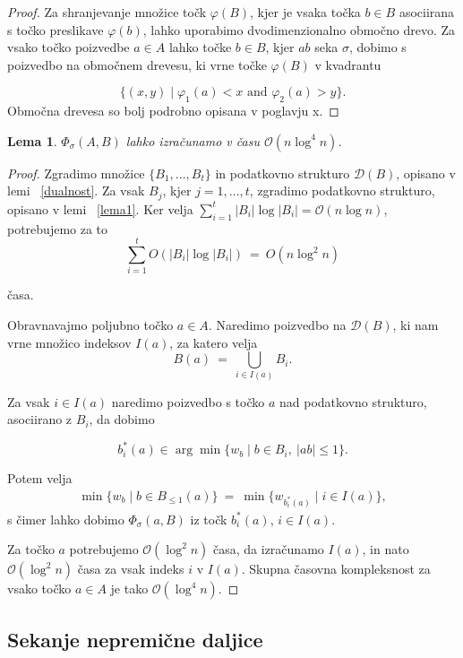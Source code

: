 \documentclass[a4paper, 12pt]{book}
\newcommand{\D}{\ensuremath{\mathcal{D}}}
\newcommand{\OO}{\ensuremath{\mathcal{O}}} %
\newtheorem{lema}[izrek]{Lema}
\begin{document}
\begin{proof}
Za shranjevanje množice točk $\varphi(B)$, kjer je vsaka točka $b \in B$ asociirana s točko preslikave $\varphi(b)$, lahko uporabimo dvodimenzionalno območno drevo. Za vsako točko poizvedbe $a \in A$ lahko točke $b \in B$, kjer $ab$ seka $\sigma$, dobimo s poizvedbo na območnem drevesu, ki vrne točke $\varphi(B)$ v kvadrantu

\[
		\{(x,y)\mid  \varphi_1(a) < x \text{ and } \varphi_2(a) > y\}.
	\]
Območna drevesa so bolj podrobno opisana v poglavju x.

\end{proof}

\begin{lema}
\label{lema4}
$\Phi_\sigma(A,B)$ lahko izračunamo v času $\OO (n\log^4 n)$.
\end{lema}

\begin{proof}
Zgradimo množice $\{B_1,...,B_t\}$ in podatkovno strukturo $\D (B)$, opisano v lemi ~\ref{dualnost}. Za vsak $B_j$, kjer $j = 1,...,t$, zgradimo podatkovno strukturo, opisano v lemi ~\ref{lema1}. Ker velja $\sum_{i=1}^t |B_i|\log |B_i| = \OO (n\log n)$, potrebujemo za to
\[
		\sum_{i=1}^t O(|B_i| \log |B_i|) ~=~ O(n\log^2 n)
	\]

časa.

Obravnavajmo poljubno točko $a \in A$. Naredimo poizvedbo na $\D (B)$, ki nam vrne množico indeksov $I(a)$, za katero velja
\[
		B(a) ~=~ \bigcup_{i\in I(a)} B_i.
	\]

Za vsak $i\in I(a)$ naredimo poizvedbo s točko $a$ nad podatkovno strukturo, asociirano z $B_i$, da dobimo

\[	
		b_i^*(a) \in \arg\min \{ w_b \mid b\in B_i,~|ab|\le 1\}.
	\]

Potem velja
\begin{align*}
\min \{ w_b \mid b\in B_{\le 1}(a)\} ~=~ \min \{ w_{b_i^*(a)}\mid i\in I(a) \},
\end{align*}
s čimer lahko dobimo $\Phi_\sigma(a,B)$ iz točk $b_i^*(a)$, $i\in I(a)$.

Za točko $a$ potrebujemo $\OO (\log^2 n)$ časa, da izračunamo $I(a)$, in nato $\OO (\log^2 n)$ časa za vsak indeks $i$ v $I(a)$. Skupna časovna kompleksnost za vsako točko $a\in A$ je tako $\OO (\log^4 n)$.
\end{proof}

\subsection{Sekanje nepremične daljice}
\end{document}
